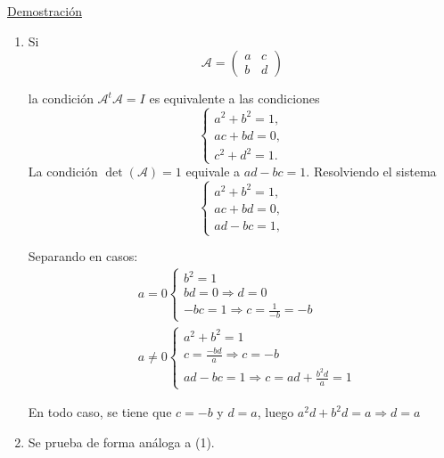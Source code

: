 \documentclass[12pt, a4paper, ones, notitlepage, openany,titlepage]{article}
\begin{document}
\noindent\underline{Demostración}
\begin{enumerate}[label=(\arabic*)]
	\item Si
	$$
	\mathcal{A}=\left(\begin{array}{ll}
		a & c \\
		b & d
	\end{array}\right)
	$$
	
	la condición $\mathcal{A}^{t} \mathcal{A}=I$ es equivalente a las condiciones
	$$
	\begin{cases}
		a^{2}+b^{2}=1, \\ a c+b d=0, \\ c^{2}+d^{2}=1 .
	\end{cases}
	$$
	La condición $\operatorname{det}(\mathcal{A})=1$ equivale a $a d-b c=1$. Resolviendo el sistema
	$$
	\begin{cases}
		a^{2}+b^{2}=1, \\ a c+b d=0, \\ a d-b c=1,
	\end{cases}
	$$
	
	Separando en casos:
	\begin{align*}
		& a = 0
		\begin{cases}
			b^2 = 1 \\
			bd = 0 \Longrightarrow d = 0 \\
			-bc = 1 \Longrightarrow c = \frac{1}{-b} = -b
		\end{cases} \\
		& a \neq 0
		\begin{cases}
			a^2 + b^2 = 1 \\
			c = \frac{-bd}{a} \Longrightarrow c = -b \\
			ad-bc = 1 \Longrightarrow c = ad + \frac{b^2 d}{a} = 1
		\end{cases}
	\end{align*}
	
	En todo caso, se tiene que $c=-b$ y $d=a$, luego $a^2 d + b^2 d = a \Longrightarrow d = a$
	
	\item Se prueba de forma análoga a (1).
\end{enumerate}
\end{document}
